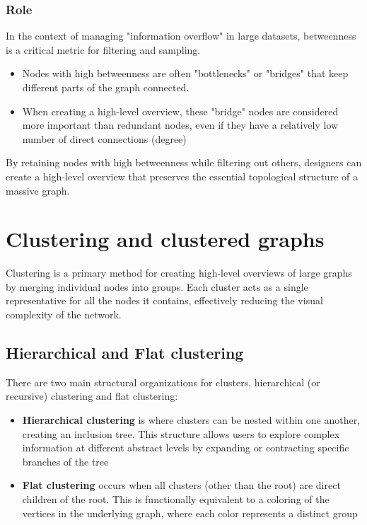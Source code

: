 \subsubsection{Role}
In the context of managing "information overflow" in large datasets, betweenness is a critical metric for filtering and sampling. 
\begin{itemize}[noitemsep]
    \item Nodes with high betweenness are often "bottlenecks" or "bridges" that keep different parts of the graph connected.
    \item When creating a high-level overview, these "bridge" nodes are considered more important than redundant nodes, even if they have a relatively low number of direct connections (degree)
\end{itemize}
By retaining nodes with high betweenness while filtering out others, designers can create a high-level overview that preserves the essential topological structure of a massive graph.

\section{Clustering and clustered graphs}
Clustering is a primary method for creating high-level overviews of large graphs by merging individual nodes into groups. Each cluster acts as a single representative for all the nodes it contains, effectively reducing the visual complexity of the network.

\subsection{Hierarchical and Flat clustering}
There are two main structural organizations for clusters, hierarchical (or recursive) clustering and flat clustering:
\begin{itemize}[noitemsep]
    \item \textbf{Hierarchical clustering} is where clusters can be nested within one another, creating an inclusion tree. This structure allows users to explore complex information at different abstract levels by expanding or contracting specific branches of the tree
    \item \textbf{Flat clustering} occurs when all clusters (other than the root) are direct children of the root. This is functionally equivalent to a coloring of the vertices in the underlying graph, where each color represents a distinct group
\end{itemize}

